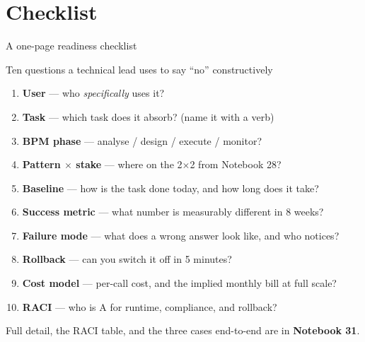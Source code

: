 \documentclass[aspectratio=169,11pt]{beamer}
\begin{document}
\section{Checklist}
\begin{frame}{A one-page readiness checklist}
  \footnotesize
  \begin{block}{Ten questions a technical lead uses to say ``no'' constructively}
    \begin{enumerate}
      \item \textbf{User} --- who \emph{specifically} uses it?
      \item \textbf{Task} --- which task does it absorb? (name it with a verb)
      \item \textbf{BPM phase} --- analyse / design / execute / monitor?
      \item \textbf{Pattern $\times$ stake} --- where on the 2$\times$2 from Notebook 28?
      \item \textbf{Baseline} --- how is the task done today, and how long does it take?
      \item \textbf{Success metric} --- what number is measurably different in 8 weeks?
      \item \textbf{Failure mode} --- what does a wrong answer look like, and who notices?
      \item \textbf{Rollback} --- can you switch it off in 5 minutes?
      \item \textbf{Cost model} --- per-call cost, and the implied monthly bill at full scale?
      \item \textbf{RACI} --- who is A for runtime, compliance, and rollback?
    \end{enumerate}
  \end{block}
  {\footnotesize Full detail, the RACI table, and the three cases end-to-end are in \textbf{Notebook 31}.}
\end{frame}
\end{document}

